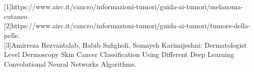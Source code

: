 \documentclass[12pt,a4paper,oneside]{report} %
\begin{document}
     





\setcounter{chapter}{0}
\renewcommand{\chaptername}{}
\renewcommand{\thechapter}{{Biography}}
\chapter{}
[1]https://www.airc.it/cancro/informazioni-tumori/guida-ai-tumori/melanoma-cutaneo.\\

[2]https://www.airc.it/cancro/informazioni-tumori/guida-ai-tumori/tumore-della-pelle.\\

[3]Amirreza Rezvantalab, Habib Safigholi, Somayeh Karimijeshni: Dermatologist Level Dermoscopy Skin Cancer Classification Using Different Deep Learning Convolutional Neural 
Networks Algorithms.\\
\end{document}
